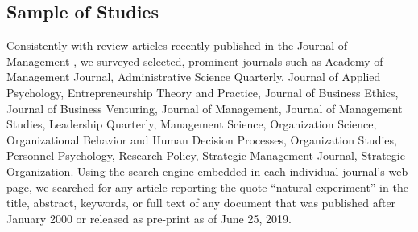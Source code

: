 \documentclass[nobib]{tufte-handout}
\begin{document}
\begin{refsection}
\subsection{Sample of Studies}
\label{subsec:sample_of_studies}


%
%

Consistently with review articles recently published in the Journal of
Management \parencite{gonzalez2018,rindova2018}, we surveyed selected, prominent
journals such as Academy of Management Journal, Administrative Science
Quarterly, Journal of Applied Psychology, Entrepreneurship Theory and Practice,
Journal of Business Ethics, Journal of Business Venturing, Journal of
Management, Journal of Management Studies, Leadership Quarterly, Management
Science, Organization Science, Organizational Behavior and Human Decision
Processes, Organization Studies, Personnel Psychology, Research Policy,
Strategic Management Journal, Strategic Organization. Using the search engine
embedded in each individual journal’s web-page, we searched for any article
reporting the quote ``natural experiment'' in the title, abstract, keywords, or
full text of any document that was published after January 2000 or released as
pre-print as of June 25, 2019.


\end{refsection}
\end{document}
